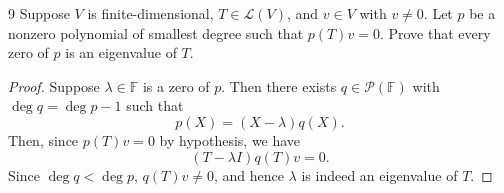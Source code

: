 \documentclass{extarticle}
\newenvironment{problem}[1]{\begin{prob*}{#1}{}}{\end{prob*}}
\newcommand{\F}{\mathbb{F}}
\newcommand{\poly}{\mathcal{P}}
\newcommand{\Hom}{\mathcal{L}}
\begin{document}
\begin{problem}{9}
Suppose $V$ is finite-dimensional, $T\in\Hom(V)$, and $v\in V$ with $v\neq 0$.  Let $p$ be a nonzero polynomial of smallest degree such that $p(T)v = 0$.  Prove that every zero of $p$ is an eigenvalue of $T$.
\end{problem}
\begin{proof}
Suppose $\lambda\in\F$ is a zero of $p$.  Then there exists $q\in\poly(\F)$ with $\deg q = \deg p - 1$ such that 
\begin{equation*}
p(X) = (X - \lambda)q(X).
\end{equation*}
Then, since $p(T)v = 0$ by hypothesis, we have
\begin{equation*}
(T - \lambda I)q(T)v = 0.
\end{equation*}
Since $\deg q < \deg p$, $q(T)v\neq 0$, and hence $\lambda$ is indeed an eigenvalue of $T$.
\end{proof}
\end{document}
